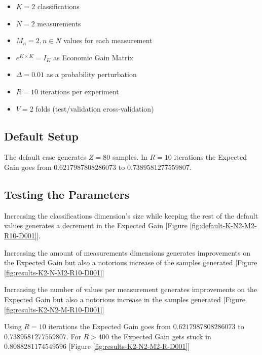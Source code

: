 \documentclass[letterpaper, conference]{IEEEtran}
\begin{document}
\begin{itemize}
  \item $K = 2$ classifications
  \item $N = 2$ measurements
  \item $M_n = 2, n \in N$ values for each measurement
  \item $e^{K \times K} = I_K$ as Economic Gain Matrix
  \item $\Delta = 0.01$ as a probability perturbation
  \item $R = 10$ iterations per experiment
  \item $V = 2$ folds (test/validation cross-validation)
\end{itemize}

\subsection{Default Setup}

The default case generates $Z = 80$ samples. In $R = 10$ iterations the Expected Gain goes from $0.6217987808286073$ to $0.7389581277559807$.

\subsection{Testing the Parameters}

Increasing the classifications dimension's size while keeping the rest of the default values generates a decrement in the Expected Gain [Figure \ref{fig:default-K-N2-M2-R10-D001}].



Increasing the amount of measurements dimensions generates improvements on the Expected Gain but also a notorious increase of the samples generated [Figure \ref{fig:results-K2-N-M2-R10-D001}]



Increasing the number of values per measurement generates improvements on the Expected Gain but also a notorious increase in the samples generated [Figure \ref{fig:results-K2-N2-M-R10-D001}]



Using $R = 10$ iterations the Expected Gain goes from $0.6217987808286073$ to $0.7389581277559807$. For $R > 400$ the Expected Gain gets stuck in $0.8088281174549596$ [Figure \ref{fig:results-K2-N2-M2-R-D001}]


\end{document}
